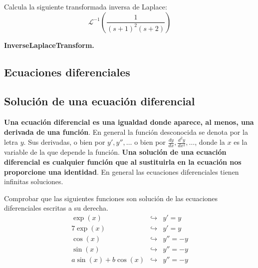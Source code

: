 \documentclass[a4paper,10pt, draft]{article}
\newenvironment{capitulo}{\begin{tcolorbox}[colback=red!5!white,colframe=red!75!black]}{\end{tcolorbox}\bigskip}
\newenvironment{ejer}{\begin{tcolorbox}[center title, title=Ejercicios,
fonttitle=\sffamily\bfseries,colback=blue!5,colframe=orange]}{\end{tcolorbox}}
\newenvironment{funciones}{\begin{tcolorbox}[center title, title=Nuevas funciones, fonttitle=\sffamily\bfseries, colback=green!5!white,colframe=red!75!black]}{\end{tcolorbox}\bigskip}
\begin{document}
\begin{ejer}

 Calcula la siguiente transformada inversa de Laplace:
$$
\mathscr{L}^{-1}\left(\frac{1}{(s+1)^2 (s+2)}\right)
$$

\end{ejer} 


\begin{funciones}

\textbf{InverseLaplaceTransform.}

\end{funciones}


\newpage













\begin{capitulo}

\section{Ecuaciones diferenciales}


\end{capitulo}


\subsection{Solución de una ecuación diferencial}

\textbf{Una ecuación diferencial es una igualdad donde aparece, al menos, una derivada de una función}. En general la función desconocida se denota por la letra $y$. Sus derivadas, o bien por $y', y'',\dots$ o bien por $\frac{dy}{dx},\frac{d^2y}{dx^2}, \dots$, donde la $x$ es la variable de la que depende la función. \textbf{Una solución de una ecuación diferencial es cualquier función que al sustituirla en la ecuación nos proporcione una identidad}. En general las ecuaciones diferenciales tienen infinitas soluciones.

\begin{ejer}

Comprobar que las siguientes funciones son solución de las ecuaciones diferenciales escritas a su derecha.
\begin{eqnarray*}
\exp(x) &\hookrightarrow& y'=y\\
7\exp(x) &\hookrightarrow& y'=y\\
 \cos(x) &\hookrightarrow& y''=-y\\
 \sin(x) &\hookrightarrow& y''=-y\\
 a\sin(x)+b\cos(x)  &\hookrightarrow& y''=-y
\end{eqnarray*}





\end{ejer}
\end{document}
